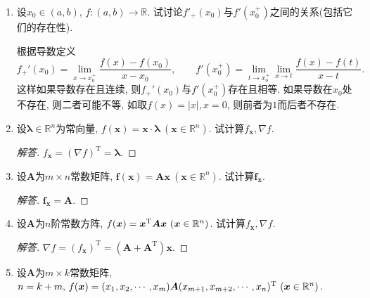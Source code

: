 \begin{1a}
\begin{enumerate}
\begin{enumerate}[label=(\arabic*)]
\begin{proof}[讨论]
反过来，$f$在$x_0$可导时极限可能不存在。令$x_0=0$，
\[f(x)=\begin{cases}x^2\sin\frac{1}{x},&x\ne0,\\0,&x=0.\end{cases}\]
取$t_k=(2k\pi)^{-1},s_k=\big(\big(2k+\frac{1}{2}\big)\pi\big)^{-1}$，有
\[\lim_{k\to\infty}\frac{f(t_k)-f(s_k)}{t_k-s_k}
=\lim_{k\to\infty}\frac{-s_k^2}{t_k-s_k}=-\frac{2}{\pi};\]
取$t_k=(2k\pi)^{-1},s_k=((2k+1)\pi)^{-1}$，有
\[\lim_{k\to\infty}\frac{f(t_k)-f(s_k)}{t_k-s_k}=0.\qedhere\]
\end{proof}
\end{enumerate}
\item 设\(x_0\in(a,b)\), \(f:(a,b)\rightarrow\mathbb{R}\). 
试讨论\(f'_+(x_0)\)与\(f'(x_0^+)\)之间的关系(包括它们的存在性).

根据导数定义\[f_+'(x_0)=\lim_{x\rightarrow x_0^+}\frac{f(x)-f(x_0)}{x-x_0},\qquad f'(x_0^+)=\lim_{t\rightarrow x_0^+}\lim_{x\rightarrow t}\frac{f(x)-f(t)}{x-t}.\]
这样如果导数存在且连续, 则\(f_+'(x_0)\)与\(f'(x_0^+)\)存在且相等. 
如果导数在\(x_0\)处不存在, 则二者可能不等, 
如取\(f(x)=|x|,x=0\), 则前者为\(1\)而后者不存在.
\item 设\(\boldsymbol{\lambda}\in\mathbb{R}^n\)为常向量, 
\(f(\boldsymbol{x})=\boldsymbol{x}\cdot\boldsymbol{\lambda}\ (\boldsymbol{x}\in\mathbb{R}^n)\). 
试计算\(f_{\boldsymbol{x}},\nabla f\).
\begin{proof}[解答]
\(f_{\boldsymbol{x}}=(\nabla f)^\mathrm{T}=\boldsymbol{\lambda}\).
\end{proof}
\item 设\(\boldsymbol{A}\)为\(m\times n\)常数矩阵, 
\(\boldsymbol{f}(\boldsymbol{x})=\boldsymbol{Ax}\ (\boldsymbol{x}\in\mathbb{R}^n)\). 
试计算\(\boldsymbol{f_x}\).
\begin{proof}[解答]
\(\boldsymbol{f_x}=\boldsymbol{A}\).
\end{proof}
\item 设\(\boldsymbol{A}\)为\(n\)阶常数方阵, \(f(\boldsymbol{x})=\boldsymbol{x}^{\rm T}\boldsymbol{A}\boldsymbol{x}\ (\boldsymbol{x}\in\mathbb{R}^n)\). 
试计算\(f_{\boldsymbol{x}},\nabla f\).
\begin{proof}[解答]
\(\nabla f=(f_{\boldsymbol{x}})^\mathrm{T}=(\boldsymbol{A}+\boldsymbol{A}^\mathrm{T})\boldsymbol{x}\).
\end{proof}
\item 设\(\boldsymbol{A}\)为\(m\times k\)常数矩阵, \(n=k+m,\,f(\boldsymbol{x})=(x_1,x_2,\cdots,x_m)\boldsymbol{A}(x_{m+1},x_{m+2},\cdots,x_n)^{\rm T}\ (\boldsymbol{x}\in\mathbb{R}^n)\). 

\end{enumerate}
\end{1a}
